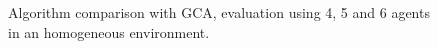\documentclass[letterpaper,conference,10pt]{IEEEconf}
\begin{document}
\begin{figure}
    \centering
    \scalebox{1.3}{}
    \vspace{-6mm}
    \caption{Algorithm comparison with GCA, evaluation using 4, 5 and 6 agents in an homogeneous environment.}
    \vspace{-4mm}
    \label{plots:hom_mpc}
\end{figure}
\end{document}
